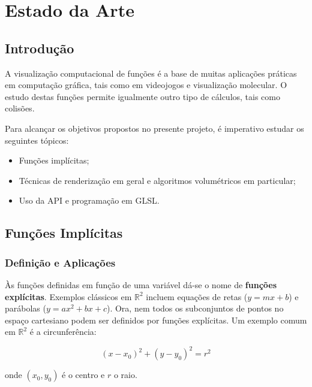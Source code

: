 \chapter{Estado da Arte}
\label{ch::arte}

\section{Introdução}
\label{sec::arte:intro}

A visualização computacional de funções é a base de muitas aplicações práticas em computação gráfica, tais como em videojogos e visualização molecular. O estudo destas funções permite igualmente outro tipo de cálculos, tais como colisões.

Para alcançar os objetivos propostos no presente projeto, é imperativo estudar os seguintes tópicos:

\begin{itemize}
	\item Funções implícitas;
	\item Técnicas de renderização em geral e algoritmos volumétricos em particular;
	\item Uso da \ac{API} \opengl e programação em \ac{GLSL}.
\end{itemize}


\section{Funções Implícitas}
\label{sec::arte:implicitas}

\subsection{Definição e Aplicações}
\label{ssec::arte:implicitas:def}


Às funções definidas em função de uma variável dá-se o nome de \textbf{funções explícitas}. Exemplos clássicos em $\mathbb{R}^2$ incluem equações de retas ($y = mx + b$) e parábolas ($y = ax^2 + bx + c$). Ora, nem todos os subconjuntos de pontos no espaço cartesiano podem ser definidos por funções explícitas. Um exemplo comum em $\mathbb{R}^2$ é a circunferência:

\begin{equation}
	(x - x_0)^2 + (y - y_0)^2 = r^2
	\label{eq::circ_implicita}
\end{equation}

onde $(x_0, y_0)$ é o centro e $r$ o raio.

